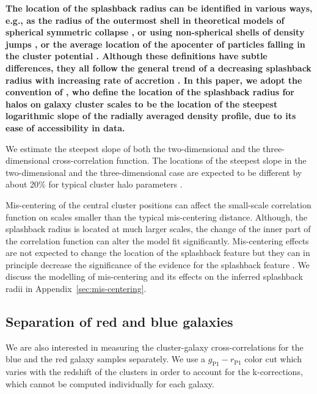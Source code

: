 \documentclass[iop, apjl, twocolappendix, numberedappendix]{emulateapj}
\begin{document}
\textbf{The location of the splashback radius can be identified in various
ways, e.g., as the radius of the outermost shell in theoretical models of
spherical symmetric collapse \citep{adhikari2014splashback, shi2016outer}, or
using non-spherical shells of density jumps \citep{ mansfield2017splashback},
or the average location of the apocenter of particles falling in the cluster
potential \citet{diemer2017splashback}. Although these definitions have subtle
differences, they all follow the general trend of a decreasing splashback
radius with increasing rate of accretion \citep{diemer2017splashback}.
In this paper, we adopt the convention of
\citet{more2015splashback}, who define the location of the splashback radius
for halos on galaxy cluster scales to be the location of the steepest
logarithmic slope of the radially averaged density profile, due to its ease of
accessibility in data.}

We estimate the steepest slope of both the two-dimensional
and the three-dimensional cross-correlation function. The
locations of the steepest slope in the two-dimensional and the
three-dimensional case are expected to be different by
about 20\% for typical cluster halo parameters
\citep{diemer2014dependence, more2016detection}.

Mis-centering of the central cluster positions can affect the
small-scale correlation function on scales smaller than the typical
mis-centering distance.  Although, the splashback radius is located at
much larger scales, the change of the inner part of the correlation
function can alter the model fit significantly.  Mis-centering effects
are not expected to change the location of the splashback feature but
they can in principle decrease the significance of the evidence for
the splashback feature \citep{baxter2017halo}.  We discuss the
modelling of mis-centering and its effects on the inferred splashback
radii in Appendix~\ref{sec:mis-centering}.

\subsection{Separation of red and blue galaxies}
\label{sec:Color}

We are also interested in measuring the cluster-galaxy
cross-correlations for the blue and the red galaxy samples
separately. We use a $g_{\mathrm{P1}}-r_{\mathrm{P1}}$ color cut
which varies with the redshift of the clusters in order to account
for the k-corrections, which cannot be computed individually for
each galaxy.
\end{document}
